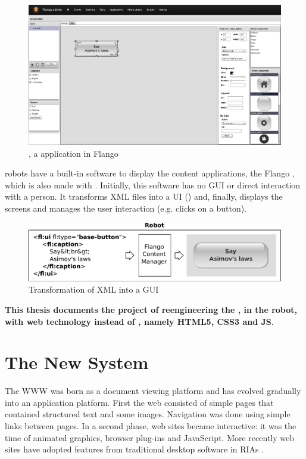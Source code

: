 \begin{figure}[htb]
    \centering
    \includegraphics[width=\textwidth]{figures/screens-editor}
    \caption{\se , a \flash application in Flango}
    \label{fig:screens-editor}
\end{figure}

 robots have a built-in software to display the content applications, the Flango \cm , which is also made with \flash .
Initially, this software has no \ac{GUI} or direct interaction with a person.
It transforms \ac{XML} files into a \ac{UI} () and, finally, displays the screens and manages the user interaction (e.g. clicks on a button).

\begin{figure}[htb]
    \centering
    \includegraphics[width=\textwidth]{figures/xml-flango-screenshot}
    \caption{Transformation of \acs{XML} into a \acs{GUI}}
    \label{fig:xml-flango-view}
\end{figure}

\textbf{This thesis documents the project of reengineering the \cm , in the robot, with web technology instead of \flash , namely \acs{HTML5}, \acs{CSS3} and \acf{JS}}.

\section{The New System}
The \ac{WWW} was born as a document viewing platform and has evolved gradually into an application platform. 
First the web consisted of simple pages that contained structured text and some images. 
Navigation was done using simple links between pages. 
In a second phase, web sites became interactive: 
it was the time of animated graphics, browser plug-ins and JavaScript. 
More recently web sites have adopted features from traditional desktop software in \acp{RIA} \cite{Anttonen:2011}.

